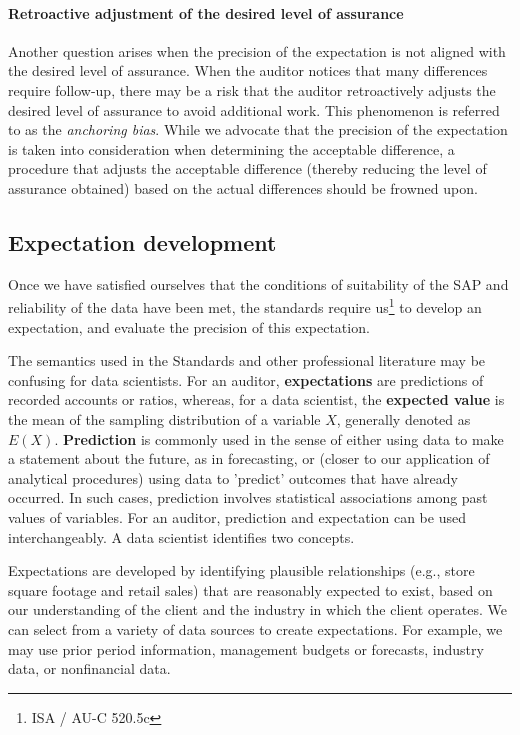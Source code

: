 \paragraph{Retroactive adjustment of the desired level of assurance} Another question arises when the precision of the expectation is not aligned with the desired level of assurance. When the auditor notices that many differences require follow-up, there may be a risk that the auditor retroactively adjusts the desired level of assurance to avoid additional work. This phenomenon is referred to as the \textit{anchoring bias}. While we advocate that the precision of the expectation is taken into consideration when determining the acceptable difference, a procedure that adjusts the acceptable difference (thereby reducing the level of assurance obtained) based on the actual differences should be frowned upon.


\subsection{Expectation development} %
\label{sub:expectation_development}

Once we have satisfied ourselves that the conditions of suitability of the SAP and reliability of the data have been met, the standards require us\footnote{ISA / AU-C 520.5c} to develop an expectation, and evaluate the precision of this expectation.

The semantics used in the Standards and other professional literature may be confusing for data scientists. 
For an auditor, \textbf{expectations} are predictions of recorded accounts or ratios, whereas, for a data scientist, the \textbf{expected value} is the mean of the sampling distribution of a variable $X$, generally denoted as $E(X)$. 
\textbf{Prediction} is commonly used in the sense of either using data to make a statement about the future, as in forecasting, or (closer to our application of analytical procedures) using data to 'predict' outcomes that have already occurred. 
In such cases, prediction involves statistical associations among past values of variables. 
For an auditor, prediction and expectation can be used interchangeably. 
A data scientist identifies two concepts.

Expectations are developed by identifying plausible relationships (e.g., store square footage and retail sales) that are reasonably expected to exist, based on our understanding of the client and the industry in which the client operates. We can select from a variety of data sources to create expectations. For example, we may use prior period information, management budgets or forecasts, industry data, or nonfinancial data.

